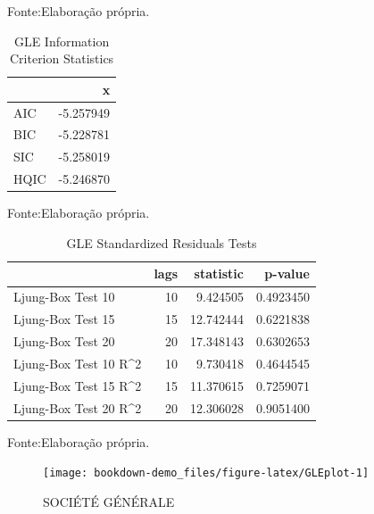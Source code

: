 \documentclass[
  12pt,
  a4paper,
  openany]{book}
\begin{document}
Fonte:Elaboração própria.

\justifying
\bigskip

\begin{table}[!h]

\caption{\label{tab:unnamed-chunk-30}GLE Information Criterion Statistics}
\centering
\begin{tabular}[t]{lr}
\toprule
  & x\\
\midrule
AIC & -5.257949\\
BIC & -5.228781\\
SIC & -5.258019\\
HQIC & -5.246870\\
\bottomrule
\end{tabular}
\end{table}
\FloatBarrier
\centering

Fonte:Elaboração própria.

\justifying
\bigskip

\begin{table}[!h]

\caption{\label{tab:unnamed-chunk-31}GLE Standardized Residuals Tests}
\centering
\begin{tabular}[t]{lrrr}
\toprule
  & lags & statistic & p-value\\
\midrule
Ljung-Box Test 10 & 10 & 9.424505 & 0.4923450\\
Ljung-Box Test 15 & 15 & 12.742444 & 0.6221838\\
Ljung-Box Test 20 & 20 & 17.348143 & 0.6302653\\
Ljung-Box Test 10 R\textasciicircum{}2 & 10 & 9.730418 & 0.4644545\\
Ljung-Box Test 15 R\textasciicircum{}2 & 15 & 11.370615 & 0.7259071\\
\addlinespace
Ljung-Box Test 20 R\textasciicircum{}2 & 20 & 12.306028 & 0.9051400\\
\bottomrule
\end{tabular}
\end{table}
\FloatBarrier
\centering

Fonte:Elaboração própria.

\justifying
\bigskip
\begin{figure}

{\centering \texttt{[image: bookdown-demo\_files/figure-latex/GLEplot-1]} 

}

\caption{SOCIÉTÉ GÉNÉRALE}\label{fig:GLEplot}
\end{figure}
\FloatBarrier
\centering
\end{document}
